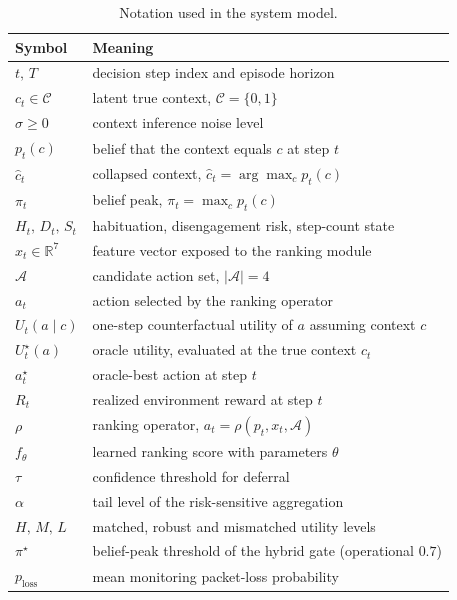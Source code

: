 \documentclass[journal]{IEEEtran}
\begin{document}
\begin{table}[t]
\centering
\caption{Notation used in the system model.}
\label{tab:notation}
\footnotesize
\begin{tabular}{@{}ll@{}}
\toprule
Symbol & Meaning \\
\midrule
\(t,\,T\) & decision step index and episode horizon \\
\(c_t\in\mathcal{C}\) & latent true context, \(\mathcal{C}=\{0,1\}\) \\
\(\sigma\ge 0\) & context inference noise level \\
\(p_t(c)\) & belief that the context equals \(c\) at step \(t\) \\
\(\hat{c}_t\) & collapsed context, \(\hat{c}_t=\arg\max_c p_t(c)\) \\
\(\pi_t\) & belief peak, \(\pi_t=\max_c p_t(c)\) \\
\(H_t,\,D_t,\,S_t\) & habituation, disengagement risk, step-count state \\
\(x_t\in\mathbb{R}^{7}\) & feature vector exposed to the ranking module \\
\(\mathcal{A}\) & candidate action set, \(|\mathcal{A}|=4\) \\
\(a_t\) & action selected by the ranking operator \\
\(U_t(a\mid c)\) & one-step counterfactual utility of \(a\) assuming context \(c\) \\
\(U_t^\star(a)\) & oracle utility, evaluated at the true context \(c_t\) \\
\(a_t^\star\) & oracle-best action at step \(t\) \\
\(R_t\) & realized environment reward at step \(t\) \\
\(\rho\) & ranking operator, \(a_t=\rho(p_t,x_t,\mathcal{A})\) \\
\(f_\theta\) & learned ranking score with parameters \(\theta\) \\
\(\tau\) & confidence threshold for deferral \\
\(\alpha\) & tail level of the risk-sensitive aggregation \\
\(H,\,M,\,L\) & matched, robust and mismatched utility levels \\
\(\pi^\star\) & belief-peak threshold of the hybrid gate (operational \(0.7\)) \\
\(p_{\mathrm{loss}}\) & mean monitoring packet-loss probability \\
\bottomrule
\end{tabular}
\end{table}
\end{document}
